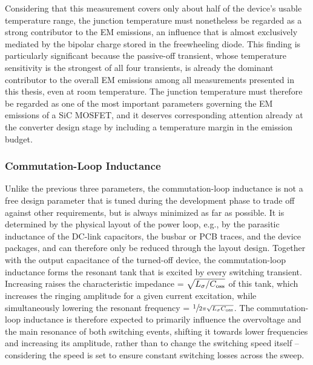 Considering that this measurement covers only about half of the device's usable temperature range, the junction temperature must nonetheless be regarded as a strong contributor to the EM emissions, an influence that is almost exclusively mediated by the bipolar charge stored in the freewheeling diode.
This finding is particularly significant because the passive-off transient, whose temperature sensitivity is the strongest of all four transients, is already the dominant contributor to the overall EM emissions among all measurements presented in this thesis, even at room temperature.
The junction temperature must therefore be regarded as one of the most important parameters governing the EM emissions of a SiC MOSFET, and it deserves corresponding attention already at the converter design stage by including a temperature margin in the emission budget.

\FloatBarrier

\subsubsection*{Commutation-Loop Inductance}

Unlike the previous three parameters, the commutation-loop inductance  is not a free design parameter that is tuned during the development phase to trade off against other requirements, but is always minimized as far as possible. 
It is determined by the physical layout of the power loop, e.g., by the parasitic inductance of the DC-link capacitors, the busbar or PCB traces, and the device packages, and can therefore only be reduced through the layout design.
Together with the output capacitance  of the turned-off device, the commutation-loop inductance forms the resonant tank that is excited by every switching transient.
Increasing  raises the characteristic impedance  = \(\sqrt{{L}_{\mathrm{\sigma}}/{C}_{\mathrm{oss}}}\) of this tank, which increases the ringing amplitude for a given current excitation, while simultaneously lowering the resonant frequency  = $\sfrac{1}{2\pi\sqrt{{L}_{\mathrm{\sigma}}{C}_{\mathrm{oss}}}}$.
The commutation-loop inductance is therefore expected to primarily influence the overvoltage and the main resonance of both switching events, shifting it towards lower frequencies and increasing its amplitude, rather than to change the switching speed itself -- considering the speed is set to ensure constant switching losses across the sweep.

